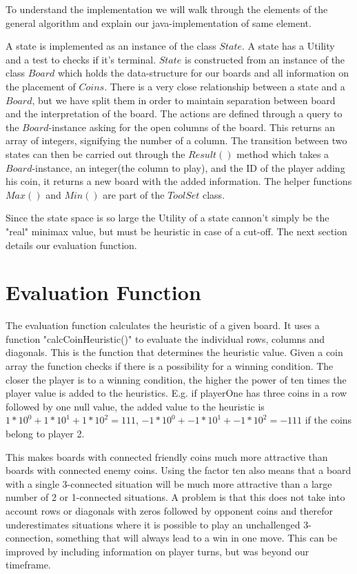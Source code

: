 \documentclass[11pt, a4paper]{article}
\begin{document}
To understand the implementation we will walk through the elements of the general algorithm and explain our java-implementation of same element.

A state is implemented as an instance of the class $State$. A state has a Utility and a test to checks if it's terminal. $State$ is constructed from an instance of the class $Board$ which holds the data-structure for our boards and all information on the placement of $Coins$. There is a very close relationship between a state and a $Board$, but we have split them in order to maintain separation between board and the interpretation of the board. The actions are defined through a query to the $Board$-instance asking for the open columns of the board. This returns an array of integers, signifying the number of a column. The transition between two states can then be carried out through the $Result()$ method which takes a $Board$-instance, an integer(the column to play), and the ID of the player adding his coin, it returns a new board with the added information. The helper functions $Max()$ and $Min()$ are part of the $ToolSet$ class.

Since the state space is so large the Utility of a state cannon't simply be the "real" minimax value, but must be heuristic in case of a cut-off. The next section details our evaluation function.

\section*{Evaluation Function}

The evaluation function calculates the heuristic of a given board. It uses a function "calcCoinHeuristic()" to evaluate the individual rows, columns and diagonals. This is the function that determines the heuristic value. Given a coin array the function checks if there is a possibility for a winning condition. The closer the player is to a winning condition, the higher the power of ten times the player value is added to the heuristics. E.g. if playerOne has three coins in a row followed by one null value, the added value to the heuristic is $1*10^0+1*10^1+1*10^2 = 111$, $-1*10^0+-1*10^1+-1*10^2 = -111$ if the coins belong to player 2.

This makes boards with connected friendly coins much more attractive than boards with connected enemy coins. Using the factor ten also means that a board with a single 3-connected situation will be much more attractive than a large number of 2 or 1-connected situations. A problem is that this does not take into account rows or diagonals with zeros followed by opponent coins and therefor underestimates situations where it is possible to play an unchallenged 3-connection, something that will always lead to a win in one move. This can be improved by including information on player turns, but was beyond our timeframe.
\end{document}
